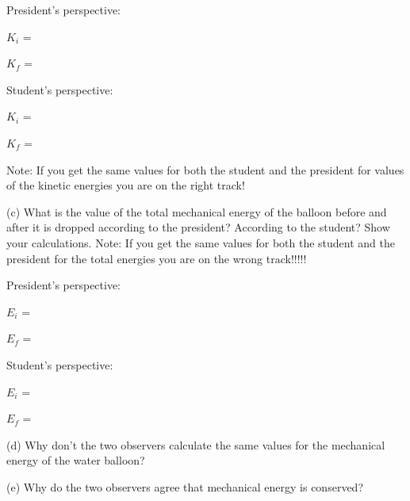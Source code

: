 President's perspective: 
\vspace{5mm}

\( K_{i} \) = 
\vspace{5mm}

\( K_{f} \) =

Student's perspective: 
\vspace{5mm}

\( K_{i} \) = 
\vspace{5mm}

\( K_{f} \) =
\vspace{5mm}

Note: If you get the same values for both the student and the president for
values of the kinetic energies you are on the right track!

(c) What is the value of the total mechanical energy of the balloon before and
after it is dropped according to the president? According to the student? Show
your calculations. Note: If you get the same values for both the student and
the president for the total energies you are on the wrong track!!!!!

President's perspective: 
\vspace{5mm}

\( E_{i} \) = 
\vspace{5mm}

\( E_{f} \) =
\vspace{5mm}

Student's perspective: 
\vspace{5mm}

\( E_{i} \) = 
\vspace{5mm}

\( E_{f} \) =
\vspace{5mm}

(d) Why don't the two observers calculate the same values for the mechanical
energy of the water balloon? 
\vspace{15mm}

(e) Why do the two observers agree that mechanical energy is conserved? 


